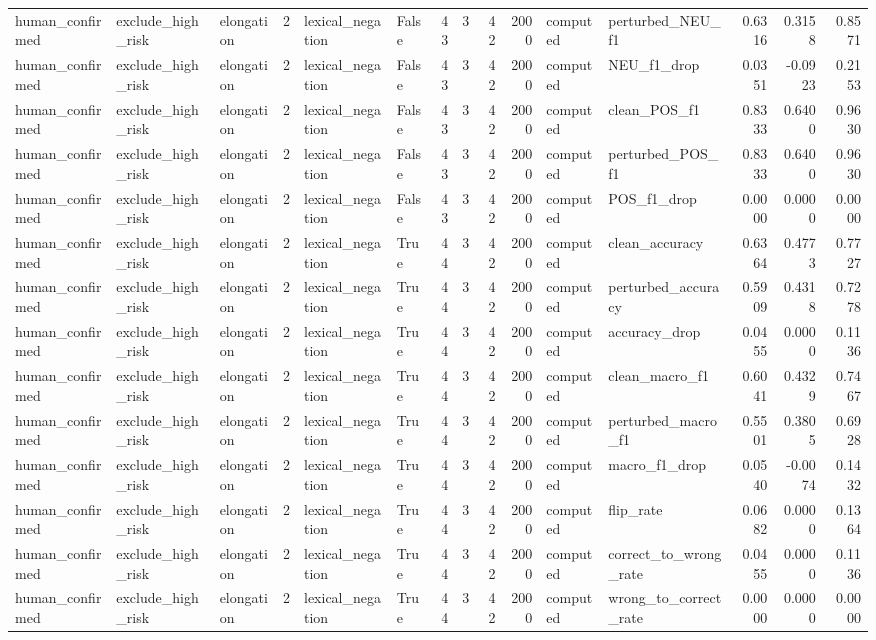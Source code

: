 \begin{tabular}{lllrllrrrrllrrr}
human_confirmed & exclude_high_risk & elongation & 2 & lexical_negation & False & 43 & 3 & 42 & 2000 & computed & perturbed_NEU_f1 & 0.6316 & 0.3158 & 0.8571 \\
human_confirmed & exclude_high_risk & elongation & 2 & lexical_negation & False & 43 & 3 & 42 & 2000 & computed & NEU_f1_drop & 0.0351 & -0.0923 & 0.2153 \\
human_confirmed & exclude_high_risk & elongation & 2 & lexical_negation & False & 43 & 3 & 42 & 2000 & computed & clean_POS_f1 & 0.8333 & 0.6400 & 0.9630 \\
human_confirmed & exclude_high_risk & elongation & 2 & lexical_negation & False & 43 & 3 & 42 & 2000 & computed & perturbed_POS_f1 & 0.8333 & 0.6400 & 0.9630 \\
human_confirmed & exclude_high_risk & elongation & 2 & lexical_negation & False & 43 & 3 & 42 & 2000 & computed & POS_f1_drop & 0.0000 & 0.0000 & 0.0000 \\
human_confirmed & exclude_high_risk & elongation & 2 & lexical_negation & True & 44 & 3 & 42 & 2000 & computed & clean_accuracy & 0.6364 & 0.4773 & 0.7727 \\
human_confirmed & exclude_high_risk & elongation & 2 & lexical_negation & True & 44 & 3 & 42 & 2000 & computed & perturbed_accuracy & 0.5909 & 0.4318 & 0.7278 \\
human_confirmed & exclude_high_risk & elongation & 2 & lexical_negation & True & 44 & 3 & 42 & 2000 & computed & accuracy_drop & 0.0455 & 0.0000 & 0.1136 \\
human_confirmed & exclude_high_risk & elongation & 2 & lexical_negation & True & 44 & 3 & 42 & 2000 & computed & clean_macro_f1 & 0.6041 & 0.4329 & 0.7467 \\
human_confirmed & exclude_high_risk & elongation & 2 & lexical_negation & True & 44 & 3 & 42 & 2000 & computed & perturbed_macro_f1 & 0.5501 & 0.3805 & 0.6928 \\
human_confirmed & exclude_high_risk & elongation & 2 & lexical_negation & True & 44 & 3 & 42 & 2000 & computed & macro_f1_drop & 0.0540 & -0.0074 & 0.1432 \\
human_confirmed & exclude_high_risk & elongation & 2 & lexical_negation & True & 44 & 3 & 42 & 2000 & computed & flip_rate & 0.0682 & 0.0000 & 0.1364 \\
human_confirmed & exclude_high_risk & elongation & 2 & lexical_negation & True & 44 & 3 & 42 & 2000 & computed & correct_to_wrong_rate & 0.0455 & 0.0000 & 0.1136 \\
human_confirmed & exclude_high_risk & elongation & 2 & lexical_negation & True & 44 & 3 & 42 & 2000 & computed & wrong_to_correct_rate & 0.0000 & 0.0000 & 0.0000 \\

\end{tabular}
